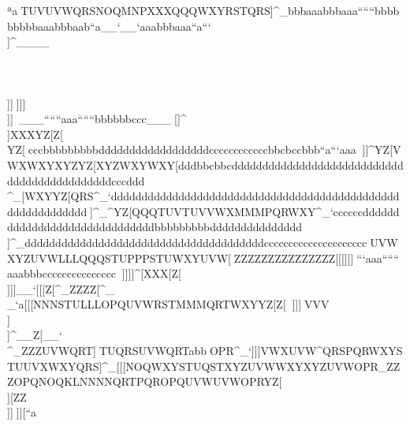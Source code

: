 ^^aaa^^^TUVUVWQRSNOQMNPXXXQQQWXYRSTQRS]^_bbbaaabbbaaa``````bbbbbbbbbaaabbbaab``a__`__`aaabbbaaa``a```\\\PQRMNPWXYSTUPQRTUVTUVQRSSTUSTU]^____\\\\\\\\\]]]^^^]]]\\\]]]^^^^^^___``````aaa``````bbbbbbccc___^^_[\][\]]]^\\]XXXYZ[Z[\[\]YZ[^^_cccbbbbbbbbbddddddddddddddddddccccccccccccbbcbccbbb``a```aaa^^^^^_]]^YZ[VWXWXYXYZYZ[XYZWXYWXY[\]dddbbcbbcdddddddddddddddddddddddddddddddddddddddddddddcccddd\\\Z[\XYZVWXUVWWXYUVXWXYXYZYZ[WXYXYZ^^^[[[\\\^^^aaacccbbcbcdcddccdddddddcccbccbccbbbbbbbbbcccddd^^^RRRTTTPPPMNPXYZXYZOOOQRSJJJPPP^_`cccbbbddddddddddddddddddddddddddddddddddddddddddaaa^^^[[[^^^[[[XYZSTUSTUOPR[\]]^_[\]WXYYZ[QRS^_`dddddddddddddddddddddddddddddddddddddddddddddddddddddddddddd^^^]^_\]^YZ[QQQTUVTUVVWXMMMPQRWXY^_`ccccccddddddddddddddddddddddddddddddbbbbbbbbbddddddddddddddd\\\NNNPQROOOOPQJJJNNNPQRMMMQRSJJJ]^_dddddddddddddddddddddddddddddddddddddddccccccccccccccccccccc^^^UVWXYZUVWLLLQQQSTUPPPSTUWXYUVW[\]^^^ZZZZZZZZZZZZZZZ[[[]]]^^^```aaa``````aaabbbccccccccccccccc^^^^^_\]]\]]]]^[\]XXX[\]Z[\\]]\]]__`                                                            [[[Z[\XYZXYZYZ[XYZXYZWXYYZ[XYZYZ[Z[\                                                            [[[YZ[WXYWXYUVWWXYVWXVWXWXYZ[\WXYYZ[                                                            ZZZMNPUWXNOPOPRQRTSTVNNNUVXSTUWXY]^_                                                            ZZZZ[\QRTYZ[_`aYZ[VWXOQR^__``aYZ[^_`                                                            ^^^XYZSTUWXYPPPRRRWXYOOOPQSOPRRST]^_                                                            \\\QRSVWXUVWWXYXYZVWXVWXQRTUVWPQR_`a                                                            [[[NNNSTULLLOPQUVWRSTMMMQRTWXYYZ[Z[\                                                            ^^^^^_\]]\]]]^^[\]VVV\\]\\]^__Z[\__`                                                            \\\Z[\XYZYZ[YZ[ZZ[YZ[WXYXYZYZ[XYZ[\]                                                            \\\YZ[WXYYZ[XYZWXYUVXUVXWXYZ[[NNNYZ[                                                            ZZZ\]^RSTNOPFFFKKKRSTMMMTUVRRROOO]^_                                                            ZZZUVWQRT]^^STUQRSUVWQRTabb^^_OPR^_`                                                            ]]]VWXUVW\]^QRSPQRWXYSTUUVXWXYQRS]^_                                                            [[[NOQWXYSTUQSTXYZUVWWXYXYZUVWOPR\]_                                                            ZZZOPQNOQKLNNNNQRTPQROPQUVWUVWOPRYZ[                                                            ^^^^^_\\][\]ZZ\ZZ\XXX\\]]^^\]][\]``a                              